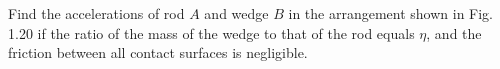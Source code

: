 \item Find the accelerations of rod $A$ and wedge $B$ in the arrangement shown in Fig. 1.20 if the ratio of the mass of the wedge to that of the rod equals $\eta$, and the friction between all contact surfaces is negligible.
    \begin{center}
    \end{center}